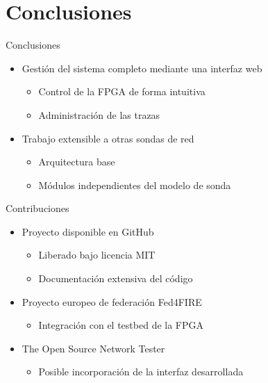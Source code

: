 \section{Conclusiones}

\begin{frame}{Conclusiones}
  \begin{itemize}
    \item\alert<+>{Gestión del sistema completo mediante una interfaz web}
    \begin{itemize}
      \item Control de la FPGA de forma intuitiva
      \item Administración de las trazas
    \end{itemize}
    \item\alert<+>{Trabajo extensible a otras sondas de red}
    \begin{itemize}
      \item Arquitectura base
      \item Módulos independientes del modelo de sonda
    \end{itemize}
  \end{itemize}
\end{frame}

\begin{frame}{Contribuciones}
  \begin{itemize}
    \item\alert<+>{Proyecto disponible en GitHub}
    \begin{itemize}
      \item Liberado bajo licencia MIT
      \item Documentación extensiva del código
    \end{itemize}
    \item\alert<+>{Proyecto europeo de federación Fed4FIRE}
    \begin{itemize}
      \item Integración con el testbed de la FPGA
    \end{itemize}
    \item\alert<+>{The Open Source Network Tester}
    \begin{itemize}
      \item Posible incorporación de la interfaz desarrollada
    \end{itemize}
  \end{itemize}
\end{frame}
